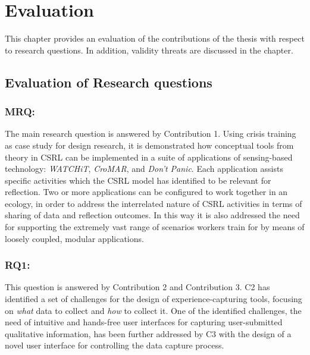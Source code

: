 \chapter{Evaluation}\label{evaluation}


This chapter provides an evaluation of the contributions of the thesis with respect to research questions. In addition, validity threats are discussed in the chapter.

\section{Evaluation of Research questions}\label{evaluation-of-research-questions}

\subsection{MRQ: \MRQ}\label{mrq-what-are-the-opportunities-introduced-by-combining-reflective-learning-theories-with-sensing-based-interfaces-for-supporting-crisis-training}

The main research question is answered by Contribution 1. Using crisis training as case study for design research, it is demonstrated how conceptual tools from theory in CSRL can be implemented in a suite of applications of sensing-based technology: \emph{WATCHiT}, \emph{CroMAR}, and \emph{Don't Panic}. Each application assists specific activities which the CSRL model has identified to be relevant for reflection. Two or more applications can be configured to work together in an ecology, in order to address the interrelated nature of CSRL activities in terms of sharing of data and reflection outcomes. In this way it is also addressed the need for supporting the extremely vast range of scenarios workers train for by means of loosely coupled, modular applications.

\subsection{RQ1: \RQi}\label{rq1-how-sensing-based-interfaces-can-be-designed-to-enable-unobtrusive-experience-collection-during-crisis-work}

This question is answered by Contribution 2 and Contribution 3. C2 has identified a set of challenges for the design of experience-capturing tools, focusing on \emph{what} data to collect and \emph{how} to collect it. One of the identified challenges, the need of intuitive and hands-free user interfaces for capturing user-submitted qualitative information, has been further addressed by C3 with the design of a novel user interface for controlling the data capture process.

